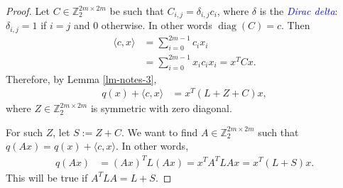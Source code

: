 \documentclass[12pt,a4paper]{article}
\newcommand{\mb}[1]{\mathbb{#1}}
\newcommand{\Z}{\mb{Z}}
\newcommand{\Emph}[1]{\emph{\textcolor{blue}{#1}}}
\newcommand{\diag}[1]{\operatorname{diag}\left(#1\right)}
\begin{document}
\begin{proof}
Let $C \in \Z_2^{2 m \times 2 m}$ be such that $C_{i,j} = \delta_{i,j} c_i$, where $\delta$ is the
\Emph{Dirac delta}: $\delta_{i,j}=1$ if $i=j$ and $0$ otherwise.
In other words $\diag{C} = c$.
Then
\begin{align*}
\langle c, x \rangle
&=
\sum_{i=0}^{2m-1} c_i x_i
\\
&=
\sum_{i=0}^{2m-1} x_i c_i x_i
=
x^T C x.
\end{align*}
Therefore, by Lemma \ref{lm-notes-3},
\begin{align*}
q(x) + \langle c, x \rangle
&=
x^T (L + Z + C) x,
\end{align*}
where $Z \in \Z_2^{2 m \times 2 m}$ is symmetric with zero diagonal.

For such $Z$, let $S := Z + C$.
We want to find $A \in \Z_2^{2 m \times 2 m}$ such that $q(A x) = q(x) + \langle c, x \rangle.$
In other words,
\begin{align*}
q(A x)
&=
(A x)^T L (A x)
=
x^T A^T L A x
=
x^T (L + S) x.
\end{align*}
This will be true if $A^T L A = L + S.$


\end{proof}
\end{document}
